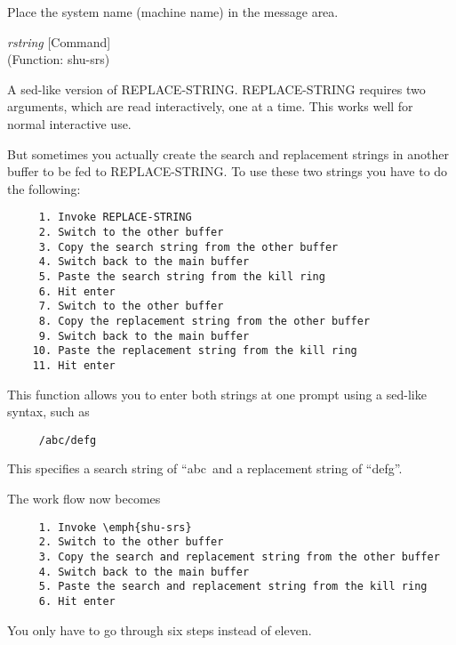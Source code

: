 \begin{doc-string}
Place the system name (machine name) in the message area.
\end{doc-string}

\vspace{1em}
\noindent
{}
\usebox{\funcname}\emph{rstring}
 \hfill [Command]\\%
 (Function: shu-srs)

\begin{doc-string}
A sed-like version of REPLACE-STRING.  REPLACE-STRING requires two arguments,
which are read interactively, one at a time.  This works well for normal
interactive use.

But sometimes you actually create the search and replacement strings in another
buffer to be fed to REPLACE-STRING.  To use these two strings you have to do the
following:

\small{\begin{verbatim}
     1. Invoke REPLACE-STRING
     2. Switch to the other buffer
     3. Copy the search string from the other buffer
     4. Switch back to the main buffer
     5. Paste the search string from the kill ring
     6. Hit enter
     7. Switch to the other buffer
     8. Copy the replacement string from the other buffer
     9. Switch back to the main buffer
    10. Paste the replacement string from the kill ring
    11. Hit enter
\end{verbatim}}

This function allows you to enter both strings at one prompt using a sed-like
syntax, such as

\small{\begin{verbatim}
     /abc/defg
\end{verbatim}}

This specifies a search string of ``abc\ and a replacement string of ``defg''.

The work flow now becomes

\small{\begin{verbatim}
     1. Invoke \emph{shu-srs}
     2. Switch to the other buffer
     3. Copy the search and replacement string from the other buffer
     4. Switch back to the main buffer
     5. Paste the search and replacement string from the kill ring
     6. Hit enter
\end{verbatim}}

You only have to go through six steps instead of eleven.
\end{doc-string}

